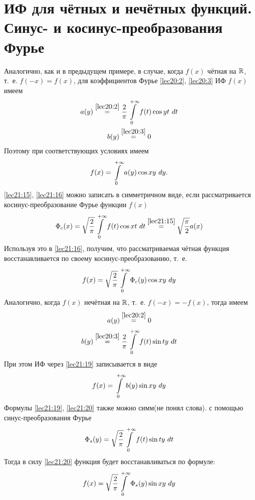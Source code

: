 \documentclass[../../main.tex]{subfiles}
\begin{document}
\section{ИФ для чётных и нечётных функций. Синус- и косинус-преобразования Фурье}

Аналогично, как и в предыдущем примере, в случае, 
когда $ f(x) $ чётная на $ \mathbb{R} $, т.~е. $ f(-x) = f(x) $, для коэффициентов Фурье
\eqref{lec20:2}, \eqref{lec20:3} ИФ $ f(x) $ имеем 
\begin{equation}
\label{lec21:15}
\begin{gathered}
a(y) \stackrel{\eqref{lec20:2}}{=}
\dfrac{2}{\pi} \int\limits_{0}^{+\infty} f(t) \cos yt\ dt\\
b(y) \stackrel{\eqref{lec20:3}}{=} 0
\end{gathered}
\end{equation}
Поэтому при соответствующих условиях имеем 
\begin{equation}
\label{lec21:16}
f(x) = \int\limits_{0}^{+\infty} a(y) \cos xy\ dy.
\end{equation}
\eqref{lec21:15}, \eqref{lec21:16} можно записать в симметричном виде, если 
рассматривается косинус-преобразование Фурье функции $ f(x) $
\[
\Phi_c(x) = \sqrt{\dfrac{2}{\pi}} \int\limits_{0}^{+\infty} f(t) \cos xt\ dt
\stackrel{\eqref{lec21:15}}{=} \sqrt{\dfrac{\pi}{2}}a(x)
\]
Используя это в \eqref{lec21:16}, получим, что рассматриваемая
чётная функция восстанавливается по своему косинус-преобразованию, т.~е.
\[
f(x) = \sqrt{\dfrac{2}{\pi}} \int\limits_{0}^{+\infty} \Phi_c(y) \cos xy\ dy
\]
Аналогично, когда $ f(x) $ нечётная на $ \mathbb{R} $, т.~е.
$ f(-x) = -f(x) $, тогда имеем 
\begin{equation}
\label{lec21:18}
a(y) \stackrel{\eqref{lec20:2}}{=} 0
\end{equation}
\begin{equation}
\label{lec21:19}
b(y) \stackrel{\eqref{lec20:3}}{=}
\dfrac{2}{\pi}
\int\limits_{0}^{+\infty} f(t) \sin ty\ dt
\end{equation}
При этом ИФ через \eqref{lec21:19} записывается в виде
\begin{equation}
\label{lec21:20}
f(x) = \int\limits_{0}^{+\infty} b(y) \sin xy\ dy
\end{equation}
Формулы \eqref{lec21:19}, \eqref{lec21:20} также можно симм(не понял слова). с помощью синус-преобразования Фурье
\begin{equation}
\label{lec21:21}
\Phi_s(y) = \sqrt{\dfrac{2}{\pi}} \int\limits_{0}^{+\infty}
f(t) \sin ty\ dt
\end{equation}
Тогда в силу \eqref{lec21:20} функция будет восстанавливаться по формуле:
\begin{equation}
\label{lec21:22}
f(x) = \sqrt{\dfrac{2}{\pi}} \int\limits_{0}^{+\infty} \Phi_s(y) \sin xy\ dy
\end{equation}
\end{document}
